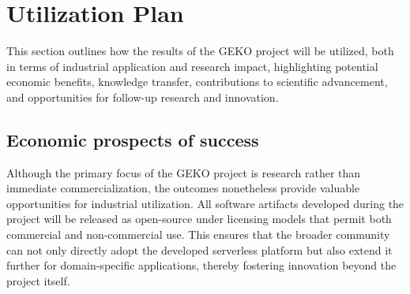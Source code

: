 \clearpage
\section{Utilization Plan}
\label{sec:verwertungsplan}

This section outlines how the results of the GEKO project will be utilized, both in terms of industrial application and research impact, highlighting potential economic benefits, knowledge transfer, contributions to scientific advancement, and opportunities for follow-up research and innovation.

\subsection{Economic prospects of success}
\label{sec:verwertungsplan:wirtschaft}


%

Although the primary focus of the GEKO project is research rather than immediate commercialization, the outcomes nonetheless provide valuable opportunities for industrial utilization. All software artifacts developed during the project will be released as open-source under licensing models that permit both commercial and non-commercial use. This ensures that the broader community can not only directly adopt the developed serverless platform but also extend it further for domain-specific applications, thereby fostering innovation beyond the project itself.

